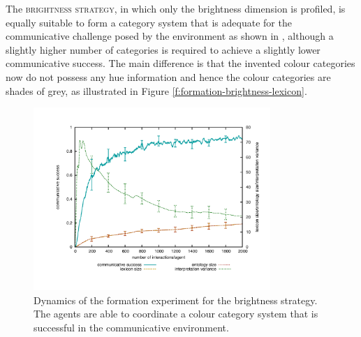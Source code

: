 The \textsc{brightness strategy}, in which only the brightness dimension
is profiled, is equally suitable to form a category system that is
adequate for the communicative challenge posed by the environment as
shown in , although a
slightly higher number of categories is required to achieve a slightly
lower communicative success. The main difference is that the invented
colour categories now do not possess any hue information and hence the
colour categories are shades of grey, as illustrated in Figure
\ref{f:formation-brightness-lexicon}.

\begin{figure}[p]
  \begin{center}
    \includegraphics[width=0.8\textwidth]{./basic-operators/figures/formation-brightness.pdf}
    \caption[Dynamics of the formation experiment for the brightness
    strategy]{Dynamics of the formation experiment for the brightness
      strategy. The agents are able to coordinate a colour category
      system that is successful in the communicative environment.}
    \label{f:formation-brightness-dynamics}
  \end{center}
\end{figure}

